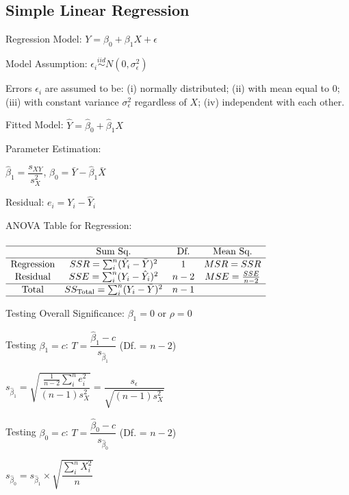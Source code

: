 \documentclass[%
 aip,
 jmp,%
 amsmath,amssymb,
 reprint,%
]{revtex4-1}
\begin{document}
\subsection{Simple Linear Regression}
\begin{itemize}[label={}]
\item Regression Model: $Y = \beta_0 + \beta_1X + \epsilon$
\item Model Assumption: $\epsilon_i \overset{iid}{\sim} N(0, \sigma_{\epsilon}^2)$
{\footnotesize
\item Errors $\epsilon_i$ are assumed to be: (i) normally distributed; (ii) with mean equal to $0$; (iii) with constant variance $\sigma_{\epsilon}^2$ regardless of $X$; (iv) independent with each other.
}
\item Fitted Model: $\hat{Y}=\hat{\beta}_0 + \hat{\beta}_1X$
\item Parameter Estimation: 
\item $\hat{\beta}_1=\dfrac{s_{XY}}{s_X^2}$, $\hat{\beta}_0=\bar{Y}-\hat{\beta}_1\bar{X}$
\item Residual: $e_i=Y_i-\hat{Y}_i$
\item ANOVA Table for Regression:\\\\
{\footnotesize
$\begin{array}{cccc}
\hline
& \textrm{Sum Sq.} & \textrm{Df.} & \textrm{Mean Sq.} \\
\hline
\textrm{Regression} & SSR=\sum_{i}^n (\hat{Y}_i-\bar{Y})^2 & 1 & MSR=SSR \\
\textrm{Residual} & SSE=\sum_{i}^n (Y_i-\hat{Y}_i)^2 & n-2 & MSE=\frac{SSE}{n-2} \\
\hline
\textrm{Total} & SS_{\textrm{Total}}=\sum_{i}^n (Y_i-\bar{Y})^2 & n-1 \\
\hline
\end{array}
$}
\item Testing Overall Significance: $\beta_1=0$ or $\rho=0$
\item Testing $\beta_1=c$: $T=\dfrac{\hat{\beta}_1-c}{s_{\hat{\beta}_1}}$ {\small (Df. = $n-2$)}
\item $s_{\hat{\beta}_1} = \sqrt{\dfrac{\frac{1}{n-2}\sum_i^n e_i^2}{(n-1)s_X^2}} = \dfrac{s_{\epsilon}}{\sqrt{(n-1)s_X^2}}$\\
\item Testing $\beta_0=c$: $T=\dfrac{\hat{\beta}_0-c}{s_{\hat{\beta}_0}}$ {\small (Df. = $n-2$)} \\
\item $s_{\hat{\beta}_0} = s_{\hat{\beta}_1}\times \sqrt{\dfrac{\sum_{i}^n X_i^2}{n}}$

\end{itemize}
\end{document}
